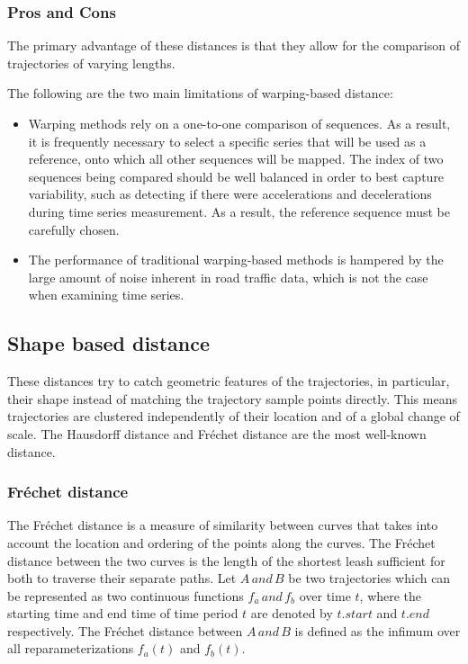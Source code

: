 \documentclass[a4paper, 12pt]{article}
\begin{document}
\subsubsection{Pros and Cons}
The primary advantage of these distances is that they allow for the comparison of trajectories of varying lengths.

The following are the two main limitations of warping-based distance: 
\begin{itemize}
    \item Warping methods rely on a one-to-one comparison of sequences.
    As a result, it is frequently necessary to select a specific series that will be used as a reference, onto which all other sequences will be mapped.
    The index of two sequences being compared should be well balanced in order to best capture variability, such as detecting if there were accelerations and decelerations during time series measurement.
    As a result, the reference sequence must be carefully chosen. 
    \item The performance of traditional warping-based methods is hampered by the large amount of noise inherent in road traffic data, which is not the case when examining time series. 
\end{itemize}

\subsection{Shape based distance}
These distances try to catch geometric features of the trajectories, in particular, their shape instead of matching the trajectory sample points directly. This means trajectories are clustered independently of their location and of a global change of scale. The Hausdorff distance and Fréchet distance are the most well-known distance.

\subsubsection{Fréchet distance}
The Fréchet distance is a measure of similarity between curves that takes into account the location and ordering of the points along the curves. The Fréchet distance between the two curves is the length of the shortest leash sufficient for both to traverse their separate paths. Let $A\,and\,B$ be two trajectories which can be represented as two continuous functions $f_{a}\,and\,f_{b}$ over time $t$, where the starting time and end time of time period $t$ are denoted by $t.start$ and $t.end$ respectively. The Fréchet distance between $A\,and\,B$ is defined as the infimum over all reparameterizations $f_{a}(t)$ and $f_{b}(t)$. 
\end{document}

